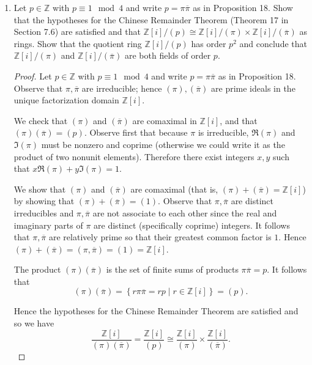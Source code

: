 \documentclass[11pt]{article}
\newcommand{\cbr}[1]{\left\{#1\right\}}
\begin{document}
\begin{enumerate}
\begin{enumerate}
\begin{proof}
            We exhibit the $q^2$ elements by $\cbr{a+bi\mid 0 \leq a,b\leq q-1}$, which yields that $\mathbb{Z}[i]/(q)$ is a field of order $q^2$ as desired.
        \end{proof}
        \item Let $p\in \mathbb{Z}$ with $p\equiv 1\mod 4$ and write $p = \pi\overline{\pi}$ as in Proposition 18. Show that the hypotheses for the Chinese Remainder Theorem (Theorem 17 in Section 7.6) are satisfied and that $\mathbb{Z}[i]/(p)\cong \mathbb{Z}[i]/(\pi)\times \mathbb{Z}[i]/(\overline{\pi})$ as rings. Show that the quotient ring $\mathbb{Z}[i]/(p)$ has order $p^2$ and conclude that $\mathbb{Z}[i]/(\pi)$ and $\mathbb{Z}[i]/(\overline{\pi})$ are both fields of order $p$.
        \begin{proof} Let $p\in \mathbb{Z}$ with $p\equiv 1\mod 4$ and write $p = \pi\overline{\pi}$ as in Proposition 18. Observe that $\pi,\overline{\pi}$ are irreducible; hence $(\pi),(\overline{\pi})$ are prime ideals in the unique factorization domain $\mathbb{Z}[i]$.
            
            We check that $(\pi)$ and $(\overline{\pi})$ are comaximal in $\mathbb{Z}[i]$, and that $(\pi)(\overline{\pi}) = (p)$. Observe first that because $\pi$ is irreducible, $\Re(\pi)$ and $\Im(\pi)$ must be nonzero and coprime (otherwise we could write it as the product of two nonunit elements). Therefore there exist integers $x,y$ such that $x\Re(\pi) + y\Im(\pi) = 1$.

            We show that $(\pi)$ and $(\overline{\pi})$ are comaximal (that is, $(\pi) + (\overline{\pi}) = \mathbb{Z}[i]$) by showing that $(\pi) + (\overline{\pi}) = (1)$. Observe that $\pi,\overline{\pi}$ are distinct irreducibles and $\pi,\overline{\pi}$ are not associate to each other since the real and imaginary parts of $\pi$ are distinct (specifically coprime) integers. It follows that $\pi,\overline{\pi}$ are relatively prime so that their greatest common factor is $1$. Hence $(\pi)+(\overline{\pi}) = (\pi,\overline{\pi}) = (1) = \mathbb{Z}[i]$.

            The product $(\pi)(\overline{\pi})$ is the set of finite sums of products $\pi\overline{\pi} = p$. It follows that \[(\pi)(\overline{\pi}) = \cbr{r\pi\overline{\pi} = rp\mid r\in \mathbb{Z}[i]} = (p).\]

            Hence the hypotheses for the Chinese Remainder Theorem are satisfied and so we have \[\frac{\mathbb{Z}[i]}{(\pi)(\overline{\pi})} = \frac{\mathbb{Z}[i]}{(p)} \cong \frac{\mathbb{Z}[i]}{(\pi)} \times \frac{\mathbb{Z}[i]}{(\overline{\pi})}.\]


\end{proof}
\end{enumerate}
\end{enumerate}
\end{document}
